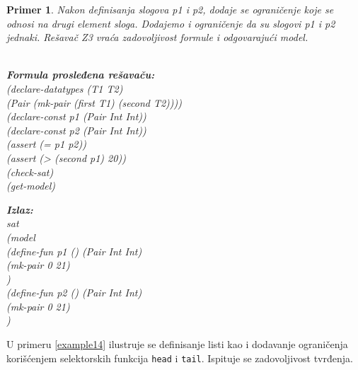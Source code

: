 \documentclass[12pt,oneside]{memoir}
\newcommand\tab[1][0.5cm]{\hspace*{#1}}
\newtheorem{primer}{Primer}
\begin{document}
\begin{primer} \label{example13} Nakon definisanja slogova p1 i p2, dodaje se ograničenje koje se odnosi na drugi element sloga.
Dodajemo i ograničenje da su slogovi p1 i p2 jednaki. Rešavač Z3 vraća zadovoljivost formule i odgovarajući model. 
\\ \\
\begin{minipage}[b]{0.5\textwidth}
\textbf{Formula prosleđena rešavaču:}
\\(declare-datatypes (T1 T2) 
\\\tab[0.3cm](Pair (mk-pair (first T1) (second T2))))
\\(declare-const p1 (Pair Int Int))
\\(declare-const p2 (Pair Int Int))
\\(assert (= p1 p2))
\\(assert (> (second p1) 20))
\\(check-sat)
\\(get-model)
\end{minipage}
\hspace{1.5cm} 
\begin{minipage}[t]{0.5\textwidth}
\vspace{-5.35cm}
\textbf{Izlaz:}
\\sat 
\\(model 
\\\tab(define-fun p1 () (Pair Int Int) 
\\\tab\tab(mk-pair 0 21)
\\\tab) 
\\\tab(define-fun p2 () (Pair Int Int) 
\\\tab\tab(mk-pair 0 21)
\\\tab)
\end{minipage}

\end{primer}
\par
U primeru \ref{example14} ilustruje se definisanje listi kao i dodavanje ograničenja korišćenjem selektorskih funkcija \texttt{head} i \texttt{tail}. Ispituje se zadovoljivost tvrđenja.
\end{document}

